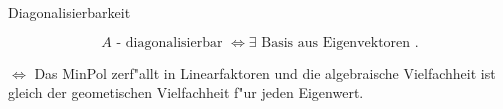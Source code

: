 \documentclass[class=article, crop=false]{standalone}
\begin{document}
\begin{zettel}{Diagonalisierbarkeit}
\begin{flashcard}
\begin{definition}[diagonalisierbar]
\[
    A \text{ - diagonalisierbar } \iff \exists \text{ Basis aus Eigenvektoren }
.\]
\end{definition}
\end{flashcard}

$\iff$  Das MinPol zerf"allt in Linearfaktoren und die algebraische Vielfachheit ist gleich der geometischen Vielfachheit f"ur jeden Eigenwert.

\end{zettel}
\end{document}

